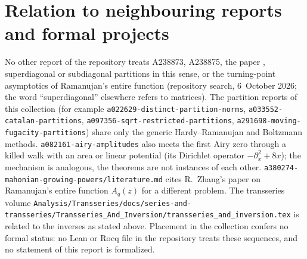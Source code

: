 \documentclass[11pt,letterpaper]{article}
\numberwithin{equation}{section}
\theoremstyle{remark}\newtheorem{remark}[theorem]{Remark}
\newcommand{\file}[1]{\nolinkurl{#1}}
\begin{document}
\section*{Relation to neighbouring reports and formal projects}\label{dgp:sec:neighbours}
No other report of the repository treats A238873, A238875, the paper \cite{abek}, superdiagonal or subdiagonal partitions in this sense, or the turning-point asymptotics of Ramanujan's entire function (repository search, 6~October 2026; the word ``superdiagonal'' elsewhere refers to matrices). The partition reports of this collection (for example \file{a022629-distinct-partition-norms}, \file{a033552-catalan-partitions}, \file{a097356-sqrt-restricted-partitions}, \file{a291698-moving-fugacity-partitions}) share only the generic Hardy--Ramanujan and Boltzmann methods. \file{a082161-airy-amplitudes} also meets the first Airy zero through a killed walk with an area or linear potential (its Dirichlet operator $-\partial_x^2+8x$); the mechanism is analogous, the theorems are not instances of each other. \file{a380274-mahonian-growing-powers/literature.md} cites R.~Zhang's paper on Ramanujan's entire function $A_q(z)$ for a different problem. The transseries volume \file{Analysis/Transseries/docs/series-and-transseries/Transseries_And_Inversion/transseries_and_inversion.tex} is related to the inverses as stated above. Placement in the collection confers no formal status: no Lean or Rocq file in the repository treats these sequences, and no statement of this report is formalized.
\clearpage
\end{document}
